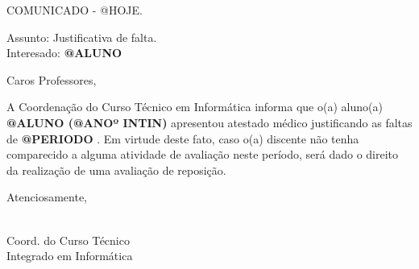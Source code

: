 \noindent COMUNICADO - @HOJE.

\noindent Assunto: Justificativa de falta.\\
Interesado: {\bf @ALUNO }

\noindent Caros Professores,

\onehalfspacing A Coordenação do Curso Técnico em Informática informa que o(a) aluno(a) {\bf @ALUNO (@ANOº INTIN) } apresentou atestado médico justificando as faltas de {\bf @PERIODO }. Em virtude deste fato, caso o(a) discente não tenha comparecido a alguma atividade de avaliação neste período, será dado o direito da realização de uma avaliação de reposição.

\noindent Atenciosamente,

\begin{flushright}
\\
\indent Coord. do Curso Técnico\\
\indent Integrado em Informática\\
\end{flushright}

